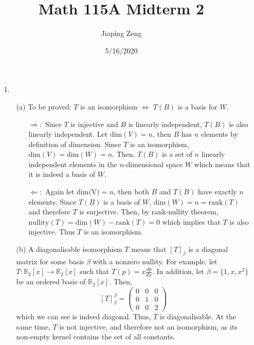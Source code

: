 \documentclass{article}
\title{Math 115A Midterm 2}
\author{Jiaping Zeng}
\date{5/16/2020}
\begin{document}
\begin{itemize}
    \item [1.]
          \begin{itemize}
              \item [(a)] To be proved: $T$ is an isomorphism $\Leftrightarrow$ $T(B)$ is a basis for $W$.
              \begin{itemize}
                  \item [$\Rightarrow:$] Since $T$ is injective and $B$ is linearly independent, $T(B)$ is also linearly independent. Let $\text{dim}(V)=n$, then $B$ has $n$ elements by definition of dimension. Since $T$ is an isomorphism, $\text{dim}(V)=\text{dim}(W)=n$. Then, $T(B)$ is a set of $n$ linearly independent elements in the $n$-dimensional space $W$ which means that it is indeed a basis of $W$.
                  \item [$\Leftarrow:$] Again let $\text{dim(V)}=n$, then both $B$ and $T(B)$ have exactly $n$ elements. Since $T(B)$ is a basis of $W$, $\text{dim}(W)=n=\text{rank}(T)$ and therefore $T$ is surjective. Then, by rank-nullity theorem, $\text{nullity}(T)=\text{dim}(W)-\text{rank}(T)=0$ which implies that $T$ is also injective. Thus $T$ is an isomorphism.
              \end{itemize}
              \item [(b)] A diagonalisable isomorphism $T$ means that $[T]_\beta$ is a diagonal matrix for some basis $\beta$ with a nonzero nullity. For example, let $T:\mathbb{R}_2[x]\rightarrow\mathbb{R}_2[x]$ such that $T(p)=x\frac{dp}{dx}$. In addition, let $\beta=\{1,x,x^2\}$ be an ordered basis of $\mathbb{R}_2[x]$. Then, 
              \[[T]_\beta^\beta=\begin{pmatrix}0&0&0\\0&1&0\\0&0&2\end{pmatrix}\] which we can see is indeed diagonal. Thus, $T$ is diagonalisable. At the same time, $T$ is not injective, and therefore not an isomorphism, as its non-empty kernel contains the set of all constants.
          \end{itemize}
\end{itemize}
\newpage
\end{document}
